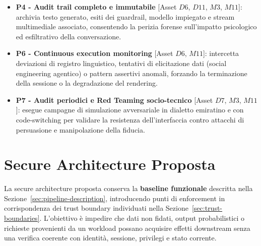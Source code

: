 \documentclass[11pt,a4paper]{article}
\begin{document}
\begin{itemize}
    \item \textbf{P4 - Audit trail completo e immutabile} [Asset $D6$, $D11$, $M3$, $M11$]:
    archivia testo generato, esiti dei guardrail, modello impiegato e stream multimediale associato, consentendo la perizia forense sull'impatto psicologico ed esfiltrativo della conversazione.

    \item \textbf{P6 - Continuous execution monitoring} [Asset $D6$, $M11$]:
    intercetta deviazioni di registro linguistico, tentativi di elicitazione dati (social engineering agentico) o pattern assertivi anomali, forzando la terminazione della sessione o la degradazione del rendering.

    \item \textbf{P7 - Audit periodici e Red Teaming socio-tecnico} [Asset $D7$, $M3$, $M11$]:
    esegue campagne di simulazione avversariale in dialetto emiratino e con code-switching per validare la resistenza dell'interfaccia contro attacchi di persuasione e manipolazione della fiducia.
\end{itemize}


\section{Secure Architecture Proposta}
\label{sec:secure-architecture}

La secure architecture proposta conserva la
\textbf{baseline funzionale} descritta nella
Sezione~\ref{sec:pipeline-description}, introducendo punti di
enforcement in corrispondenza dei trust boundary individuati nella
Sezione~\ref{sec:trust-boundaries}. L'obiettivo è impedire che dati non
fidati, output probabilistici o richieste provenienti da un workload
possano acquisire effetti downstream senza una verifica coerente con
identità, sessione, privilegi e stato corrente.
\end{document}
